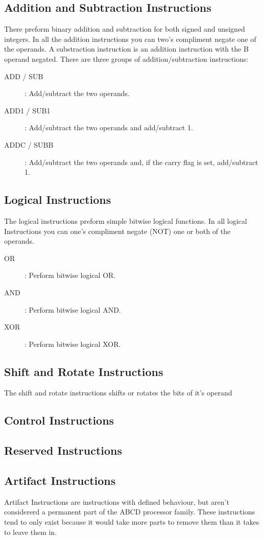 \documentclass[oneside, a4paper]{memoir}
\begin{document}
\subsection{Addition and Subtraction Instructions}
There preform binary addition and subtraction for both signed and unsigned integers. In all the addition instructions you can two's compliment negate one of the operands. A substraction instruction is an addition instruction with the B operand negated. There are three groups of addition/subtraction instructions:
\begin{description}
\item[ADD / SUB]: Add/subtract the two operands.
\item[ADD1 / SUB1]: Add/subtract the two operands and add/subtract 1.
\item[ADDC / SUBB]: Add/subtract the two operands and, if the carry flag is set, add/subtract 1.
\end{description}
\subsection{Logical Instructions}
The logical instructions preform simple bitwise logical functions. In all logical Instructions you can one's compliment negate (NOT) one or both of the operands.
\begin{description}
\item[OR]: Perform bitwise logical OR.
\item[AND]: Perform bitwise logical AND.
\item[XOR]: Perform bitwise logical XOR.
\end{description}
\subsection{Shift and Rotate Instructions}
The shift and rotate instructions shifts or rotates the bits of it's operand 
\subsection{Control Instructions}
\subsection{Reserved Instructions}
\subsection{Artifact Instructions}
Artifact Instructions are instructions with defined behaviour, but aren't considererd a permanent part of the ABCD processor family. These instructions tend to only exist because it would take more parts to remove them than it takes to leave them in.
\end{document}
